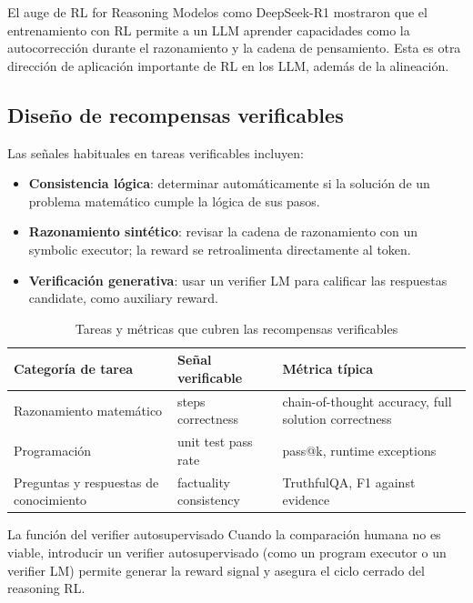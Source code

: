 \documentclass[a4paper]{article}
\begin{document}
\begin{importantbox}{El auge de RL for Reasoning}
Modelos como DeepSeek-R1 mostraron que el entrenamiento con RL permite a un LLM aprender capacidades como la autocorrección durante el razonamiento y la cadena de pensamiento. Esta es otra dirección de aplicación importante de RL en los LLM, además de la alineación.
\end{importantbox}

\subsection{Diseño de recompensas verificables}

Las señales habituales en tareas verificables incluyen:
\begin{itemize}
    \item \textbf{Consistencia lógica}: determinar automáticamente si la solución de un problema matemático cumple la lógica de sus pasos.
    \item \textbf{Razonamiento sintético}: revisar la cadena de razonamiento con un symbolic executor; la reward se retroalimenta directamente al token.
    \item \textbf{Verificación generativa}: usar un verifier LM para calificar las respuestas candidate, como auxiliary reward.
\end{itemize}

\begin{table}[H]
\centering
\begin{tabular}{p{} p{} p{}}
\toprule
Categoría de tarea & Señal verificable & Métrica típica \\
\midrule
Razonamiento matemático & steps correctness & chain-of-thought accuracy, full solution correctness \\
Programación & unit test pass rate & pass@k, runtime exceptions \\
Preguntas y respuestas de conocimiento & factuality consistency & TruthfulQA, F1 against evidence \\
\bottomrule
\end{tabular}
\caption{Tareas y métricas que cubren las recompensas verificables}
\end{table}

\begin{knowledgebox}{La función del verifier autosupervisado}
Cuando la comparación humana no es viable, introducir un verifier autosupervisado (como un program executor o un verifier LM) permite generar la reward signal y asegura el ciclo cerrado del reasoning RL.
\end{knowledgebox}
\end{document}
